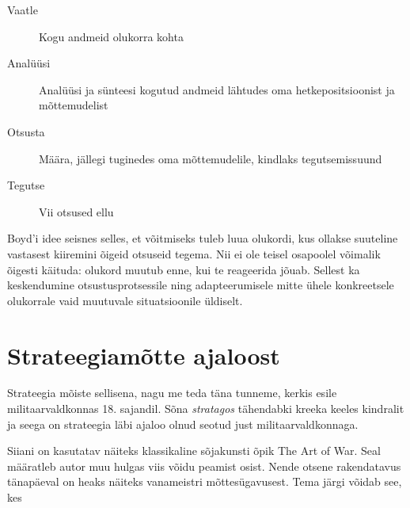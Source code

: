 \begin{description}
	\item[Vaatle] Kogu andmeid olukorra kohta
	\item[Analüüsi] Analüüsi ja sünteesi kogutud andmeid lähtudes oma hetkepositsioonist ja mõttemudelist
	\item[Otsusta] Määra, jällegi tuginedes oma mõttemudelile, kindlaks tegutsemissuund
	\item[Tegutse] Vii otsused ellu
\end{description}


Boyd'i idee seisnes selles, et võitmiseks tuleb luua olukordi, kus ollakse suuteline vastasest kiiremini õigeid otsuseid tegema. Nii ei ole teisel osapoolel võimalik õigesti käituda: olukord muutub enne, kui te reageerida jõuab. Sellest ka keskendumine otsustusprotsessile ning adapteerumisele mitte ühele konkreetsele olukorrale vaid muutuvale situatsioonile üldiselt.

\section{Strateegiamõtte ajaloost}
Strateegia mõiste sellisena, nagu me teda täna tunneme, kerkis esile militaarvaldkonnas 18. sajandil. Sõna \emph{stratagos} tähendabki kreeka keeles kindralit ja seega on strateegia läbi ajaloo olnud seotud just militaarvaldkonnaga.

Siiani on kasutatav näiteks klassikaline sõjakunsti õpik The Art of War\cite{tzu2013art}. Seal määratleb autor muu hulgas viis võidu peamist osist. Nende otsene rakendatavus tänapäeval on heaks näiteks vanameistri mõttesügavusest. Tema järgi võidab see, kes


